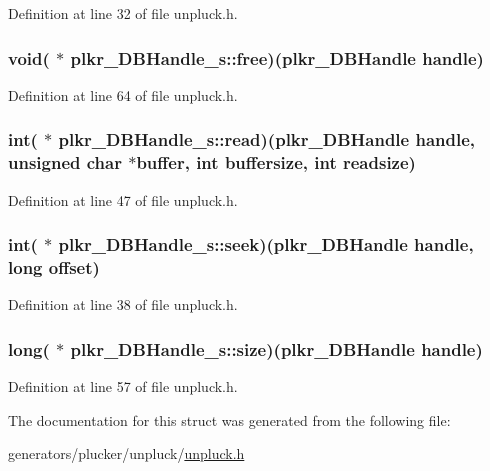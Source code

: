 Definition at line 32 of file unpluck.\+h.

\hypertarget{structplkr__DBHandle__s_a5040a81f7438fbb5a987e825a3e3df63}{
\subsubsection[{free}]{\setlength{\rightskip}{0pt plus 5cm}void( $\ast$ plkr\+\_\+\+D\+B\+Handle\+\_\+s\+::free)({\bf plkr\+\_\+\+D\+B\+Handle} handle)}}\label{structplkr__DBHandle__s_a5040a81f7438fbb5a987e825a3e3df63}


Definition at line 64 of file unpluck.\+h.

\hypertarget{structplkr__DBHandle__s_a0ab0715537eb77ede37a911b6593be9d}{
\subsubsection[{read}]{\setlength{\rightskip}{0pt plus 5cm}int( $\ast$ plkr\+\_\+\+D\+B\+Handle\+\_\+s\+::read)({\bf plkr\+\_\+\+D\+B\+Handle} handle, unsigned char $\ast$buffer, int buffersize, int readsize)}}\label{structplkr__DBHandle__s_a0ab0715537eb77ede37a911b6593be9d}


Definition at line 47 of file unpluck.\+h.

\hypertarget{structplkr__DBHandle__s_aca1e04dbcb61b099a145d7771c951fa2}{
\subsubsection[{seek}]{\setlength{\rightskip}{0pt plus 5cm}int( $\ast$ plkr\+\_\+\+D\+B\+Handle\+\_\+s\+::seek)({\bf plkr\+\_\+\+D\+B\+Handle} handle, long offset)}}\label{structplkr__DBHandle__s_aca1e04dbcb61b099a145d7771c951fa2}


Definition at line 38 of file unpluck.\+h.

\hypertarget{structplkr__DBHandle__s_abbdac090fcc71fa8fc750ae06f442776}{
\subsubsection[{size}]{\setlength{\rightskip}{0pt plus 5cm}long( $\ast$ plkr\+\_\+\+D\+B\+Handle\+\_\+s\+::size)({\bf plkr\+\_\+\+D\+B\+Handle} handle)}}\label{structplkr__DBHandle__s_abbdac090fcc71fa8fc750ae06f442776}


Definition at line 57 of file unpluck.\+h.



The documentation for this struct was generated from the following file\+:\begin{DoxyCompactItemize}
\item 
generators/plucker/unpluck/\hyperlink{unpluck_8h}{unpluck.\+h}\end{DoxyCompactItemize}
